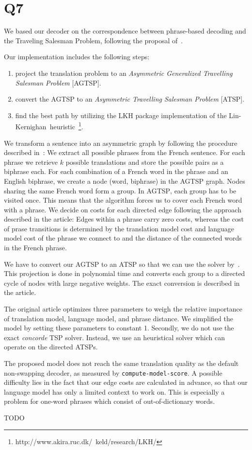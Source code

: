 \section*{Q7}

We based our decoder on the correspondence between phrase-based decoding and
the Traveling Salesman Problem, following the proposal
of~\cite{zaslavskiy2009}.

Our implementation includes the following steps:
\begin{enumerate}
    \item project the translation problem to an \emph{Asymmetric Generalized
        Travelling Salesman Problem} [\textsc{AGTSP}].
    \item convert the \textsc{AGTSP} to an \emph{Asymmetric Travelling
        Salesman Problem} [\textsc{ATSP}].
    \item find the best path by utilizing the LKH package implementation of the
        Lin-Kernighan~heuristic~\cite{Helsgaun2006}\footnote{http://www.akira.ruc.dk/~keld/research/LKH/}.
\end{enumerate}

We transform a sentence into an asymmetric graph by following the procedure
described in~\cite{zaslavskiy2009}: We extract all possible phrases from the
French sentence. For each phrase we retrieve $k$ possible translations and
store the possible pairs as a biphrase each. For each combination of a French word in the
phrase and an English biphrase, we create a node (word, biphrase) in the
\textsc{AGTSP} graph. Nodes sharing the same French word form a group. In
\textsc{AGTSP}, each group has to be visited once. This means that the
algorithm forces us to cover each French word with a phrase. We decide on
costs for each directed edge following the approach described in the
article: Edges within a phrase carry zero costs, whereas the cost of prase
transitions is determined by the translation model cost and language model
cost of the phrase we connect to and the distance of the connected words in
the French phrase.

We have to convert our \textsc{AGTSP} to an \textsc{ATSP} so that we can use
the solver by~\cite{Helsgaun2006}. This projection is done in polynomial
time and converts each group to a directed cycle of nodes with large
negative weights. The exact conversion is described in the article.

The original article optimizes three parameters to weigh the relative
importance of translation model, language model, and phrase distance.
We simplified the model by setting these parameters to constant 1. Secondly,
we do not use the exact \emph{concorde} \textsc{TSP} solver. Instead, we use
an heuristical solver which can operate on the directed \textsc{ATSP}s.

The proposed model does not reach the same translation quality as the
default non-swapping decoder, as measured by \texttt{compute-model-score}.
A possible difficulty lies in the fact that our edge costs are calculated in
advance, so that our language model has only a limited context to work on.
This is especially a problem for one-word phrases which consist of
out-of-dictionary words.

TODO
